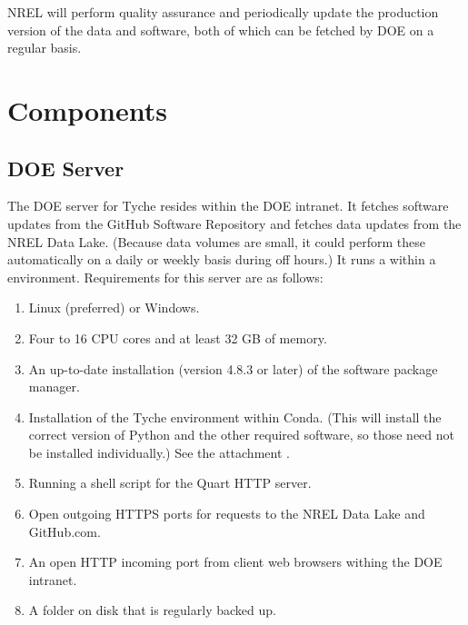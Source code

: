 \documentclass[letterpaper,10pt,english]{sphinxmanual}
\begin{document}
NREL will perform quality assurance and periodically update the
production version of the data and software, both of which can be
fetched by DOE on a regular basis.


\section{Components}
\label{\detokenize{deployment:components}}

\subsection{DOE Server}
\label{\detokenize{deployment:doe-server}}
The DOE server for Tyche resides within the DOE intranet. It fetches
software updates from the GitHub Software Repository and fetches data
updates from the NREL Data Lake. (Because data volumes are small, it
could perform these automatically on a daily or weekly basis during off
hours.) It runs a  within a
 environment.
Requirements for this server are as follows:
\begin{enumerate}
\def\theenumi{\arabic{enumi}}
\def\labelenumi{\theenumi .}
\makeatletter\def\p@enumii{\p@enumi \theenumi .}\makeatother
\item {} 
Linux (preferred) or Windows.

\item {} 
Four to 16 CPU cores and at least 32 GB of memory.

\item {} 
An up-to-date installation (version 4.8.3 or later) of the
 software
package manager.

\item {} 
Installation of the Tyche environment within Conda. (This will
install the correct version of Python and the other required
software, so those need not be installed individually.) See the
attachment .

\item {} 
Running a shell script for the Quart HTTP server.

\item {} 
Open outgoing HTTPS ports for  requests to the NREL Data Lake
and GitHub.com.

\item {} 
An open HTTP incoming port from client web browsers withing the DOE
intranet.

\item {} 
A folder on disk that is regularly backed up.

\end{enumerate}
\end{document}
